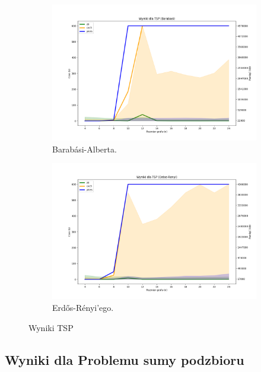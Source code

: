 \begin{figure}[htbp]
	\centering
	\begin{subfigure}[b]{0.45\textwidth}
		\includegraphics[width=\textwidth]{./figures/7-barabasi-plot.png}
		\caption{Barabási-Alberta.}
		\label{fig:7-barabasi-plot}
	\end{subfigure}
	\begin{subfigure}[b]{0.45\textwidth}
		\includegraphics[width=\textwidth]{./figures/7-erdos-renyi-plot.png}
		\caption{Erdős-Rényi'ego.}
		\label{fig:7-erdos-renyi-plot}
	\end{subfigure}
	\caption{Wyniki TSP}
	\label{fig:7}
\end{figure}

\subsection{Wyniki dla Problemu sumy podzbioru}

